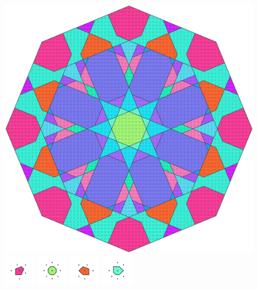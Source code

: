 \documentclass[text.tex]{subfiles}
\begin{document}
\clearpage
\pagestyle{fancy}
\fancyhf{}
\begin{figure}[h!]
\centering
\includegraphics[width=1\textwidth]{img/results/octagon/octagon_116421_(-5_4alpha_4).pdf}
\includegraphics[width=0.12\textwidth]{img/results/octagon/octagon_116421_(-5_4alpha_4)_001.pdf}
\includegraphics[width=0.12\textwidth]{img/results/octagon/octagon_116421_(-5_4alpha_4)_002.pdf}
\includegraphics[width=0.12\textwidth]{img/results/octagon/octagon_116421_(-5_4alpha_4)_003.pdf}
\includegraphics[width=0.12\textwidth]{img/results/octagon/octagon_116421_(-5_4alpha_4)_004.pdf}

\end{figure}
\end{document}
